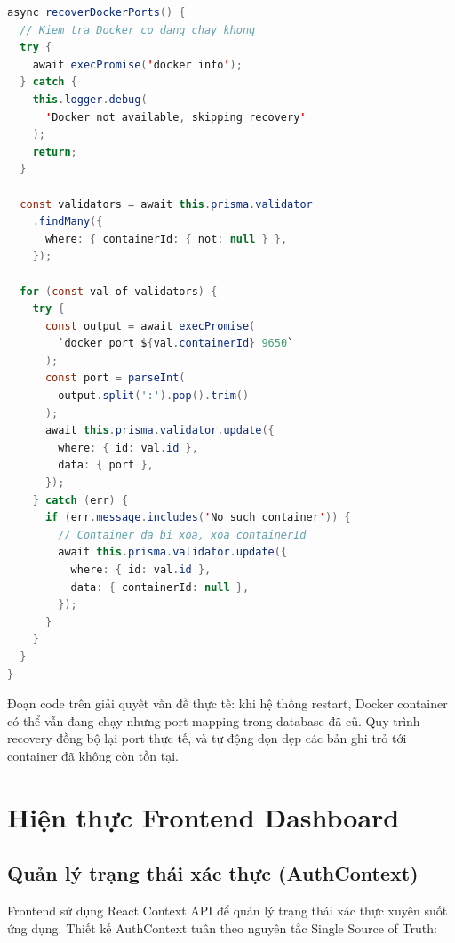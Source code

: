 \begin{lstlisting}[caption={ValidatorsService --- Phục hồi trạng thái khi khởi động}, label={lst:validator_recover}, language=Java]
async recoverDockerPorts() {
  // Kiem tra Docker co dang chay khong
  try {
    await execPromise('docker info');
  } catch {
    this.logger.debug(
      'Docker not available, skipping recovery'
    );
    return;
  }

  const validators = await this.prisma.validator
    .findMany({
      where: { containerId: { not: null } },
    });

  for (const val of validators) {
    try {
      const output = await execPromise(
        `docker port ${val.containerId} 9650`
      );
      const port = parseInt(
        output.split(':').pop().trim()
      );
      await this.prisma.validator.update({
        where: { id: val.id },
        data: { port },
      });
    } catch (err) {
      if (err.message.includes('No such container')) {
        // Container da bi xoa, xoa containerId
        await this.prisma.validator.update({
          where: { id: val.id },
          data: { containerId: null },
        });
      }
    }
  }
}
\end{lstlisting}

Đoạn code trên giải quyết vấn đề thực tế: khi hệ thống restart, Docker container có thể vẫn đang chạy nhưng port mapping trong database đã cũ. Quy trình recovery đồng bộ lại port thực tế, và tự động dọn dẹp các bản ghi trỏ tới container đã không còn tồn tại.


\section{Hiện thực Frontend Dashboard}

\subsection{Quản lý trạng thái xác thực (AuthContext)}

Frontend sử dụng React Context API để quản lý trạng thái xác thực xuyên suốt ứng dụng. Thiết kế AuthContext tuân theo nguyên tắc Single Source of Truth:

